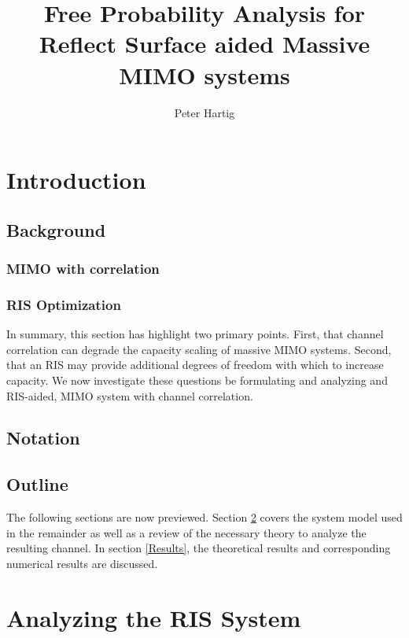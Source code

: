 \documentclass[12pt,a4paper]{report}
\title{Free Probability Analysis for Reflect Surface aided Massive MIMO systems}
\author{Peter Hartig}
\begin{document}
\maketitle
\begin{abstract}

\end{abstract}
%
\tableofcontents
\chapter{Introduction}
\section{Background}\label{Background}

\par
\subsection{MIMO with correlation}\label{mimo_corr}

\par
\subsection{RIS Optimization}\label{irs_opt}

\par
In summary, this section has highlight two primary points. First, that channel correlation can degrade the capacity scaling of massive MIMO systems. Second, that an RIS may provide additional degrees of freedom with which to increase capacity. We now investigate these questions be formulating and analyzing and RIS-aided, MIMO system with channel correlation. 

\section{Notation}

\section{Outline}
The following sections are now previewed. Section \ref{system_model} covers the system model used in the remainder as well as a review of the necessary theory to analyze the resulting channel. In section \ref{Results}, the theoretical results and corresponding numerical results are discussed. 

\chapter{Analyzing the RIS System}\label{system_model}
\end{document}
